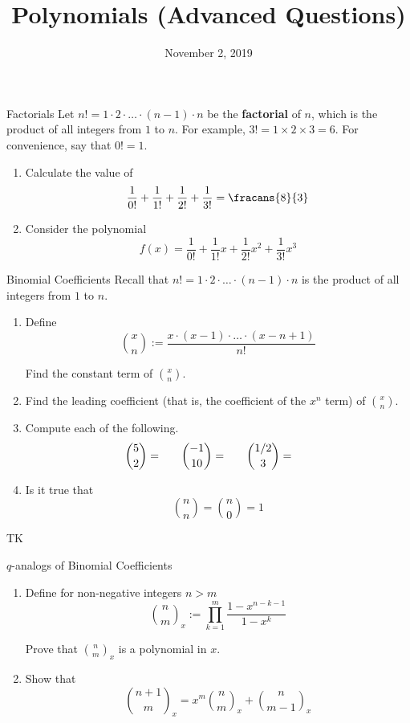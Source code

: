 \documentclass[12pt,letterpaper]{article}
\title{Polynomials (Advanced Questions)}
\date{November 2, 2019}
\begin{document}
\maketitle

\thispagestyle{empty}

\begin{problem}{Factorials}
  Let \(n! = 1 \cdot 2 \cdot \dots \cdot (n-1) \cdot n\) be the \textbf{factorial} of \(n\),
  which is the product of all integers from \(1\) to \(n\). For example, \(3! = 1 \times 2
  \times 3 = 6\). For convenience, say that \(0! = 1\).

  \begin{enumerate}
    \item Calculate the value of \[
      \frac{1}{0!} + \frac{1}{1!} + \frac{1}{2!} + \frac{1}{3!} = \fracans{8}{3}
    \]
    \item Consider the polynomial \[
      f(x) = \frac{1}{0!} + \frac{1}{1!}x + \frac{1}{2!}x^2 + \frac{1}{3!}x^3
    \]
  \end{enumerate}
\end{problem}

\begin{problem}{Binomial Coefficients}
  Recall that \(n! = 1\cdot2 \cdot \dots \cdot (n-1) \cdot n\) is the product
  of all integers from \(1\) to \(n\).

  \begin{enumerate}
    \item Define \[
      \binom{x}{n} := \frac{x\cdot(x-1)\cdot\dots\cdot(x-n+1)}{n!}
    \]

    Find the constant term of \(\binom{x}{n}\).
    \item Find the leading coefficient (that is, the coefficient of the \(x^n\)
    term) of \(\binom{x}{n}\).
    \item Compute each of the following. \[
      \binom{5}{2} = \hspace{4ex}
      \binom{-1}{10} = \hspace{4ex}
      \binom{1/2}{3} = \hspace{4ex}
    \]
    \item Is it true that \[
      \binom{n}{n} = \binom{n}{0} = 1
    \]
  \end{enumerate}
\end{problem}

TK

\begin{problem}{\(q\)-analogs of Binomial Coefficients}
  \begin{enumerate}
    \item Define for non-negative integers \(n > m\) \[
      \binom{n}{m}_x := \prod_{k=1}^{m} \frac{1-x^{n-k-1}}{1-x^{k}}
    \]

    Prove that \(\binom{n}{m}_x\) is a polynomial in \(x\).
    \item Show that \[
      \binom{n+1}{m}_x = x^m \binom{n}{m}_x + \binom{n}{m-1}_x
    \]
  \end{enumerate}
\end{problem}
\end{document}
